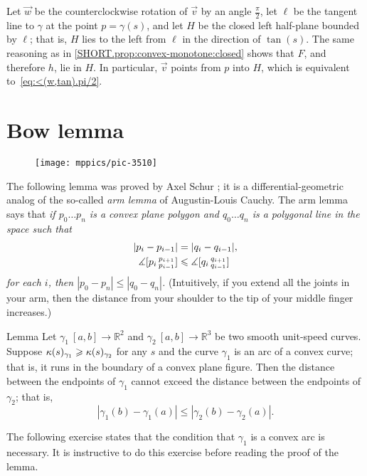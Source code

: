 Let $\vec w$ be the counterclockwise rotation of $\vec v$ by an angle $\tfrac\pi 2$, let
$\ell$ be the tangent line to $\gamma$ at the point $p=\gamma(s)$,
and let $H$ be the closed left half-plane bounded by $\ell$;
that is, $H$ lies to the left from $\ell$ in the direction of $\tan(s)$.
The same reasoning as in \ref{SHORT.prop:convex-monotone:closed} shows that $F$, and therefore $h$,
lie in $H$.
In particular, $\vec v$ points from $p$ into $H$, which is equivalent to~\ref{eq:<(w,tan).pi/2}.
\qeds

\section{Bow lemma}

\begin{wrapfigure}{r}{39 mm}
\vskip-4mm
\centering
\texttt{[image: mppics/pic-3510]}
\vskip0mm
\end{wrapfigure}

The following lemma was proved by Axel Schur \cite{shur};
it is a differential-geometric analog of the so-called {}\emph{arm lemma} of Augustin-Louis Cauchy.
The arm lemma says that 
\textit{if $p_0\dots p_n$ is a convex plane polygon and $q_0\dots q_n$ is a polygonal line in the space such that 
\begin{align*}
|p_i-p_{i-1}|&=|q_i-q_{i-1}|,
\\
\measuredangle[p_i\,{}^{p_{i+1}}_{p_{i-1}}]&\leqslant \measuredangle[q_i\,{}^{q_{i+1}}_{q_{i-1}}]
\end{align*}
for each $i$, then $|p_0-p_n|\le |q_0-q_n|$.}
(Intuitively, if you extend all the joints in your arm, then the distance from your shoulder to the tip of your middle finger increases.) 

\begin{thm}{Lemma}\label{lem:bow}
Let $\gamma_1\:[a,b]\to\mathbb{R}^2$ and $\gamma_2\:[a,b] \to\mathbb{R}^3$ be two smooth unit-speed curves.
Suppose $\kappa(s)_{\gamma_1}\geqslant\kappa(s)_{\gamma_2}$ for any $s$ 
and the curve
$\gamma_1$ is an arc of a convex curve; that is, it runs in the boundary of a convex plane figure.
Then the distance between the endpoints of $\gamma_1$ cannot exceed the  distance between the endpoints of $\gamma_2$; that is,
\[|\gamma_1(b)-\gamma_1(a)|\le |\gamma_2(b)-\gamma_2(a)|.\]

\end{thm}

The following exercise states that the condition that $\gamma_1$ is a convex arc is necessary.
It is instructive to do this exercise before reading the proof of the lemma.

